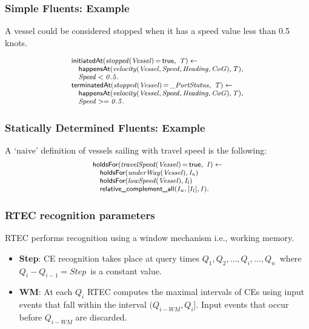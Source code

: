 \documentclass{beamer}
\newenvironment{mysplit}%
  {\arraycolsep 0pt \begin{array}{l}}%
  {\end{array}}
\def\happensAt{\textsf{\footnotesize happensAt}}
\def\holdsFor{\textsf{\footnotesize holdsFor}}
\def\initiatedAt{\textsf{\footnotesize initiatedAt}}
\def\terminatedAt{\textsf{\footnotesize terminatedAt}}
\def\complementall{\textsf{\footnotesize relative\_complement\_all}}
\def\true{\textsf{\footnotesize true}}
\DeclareMathOperator{\val}{=}  %
\begin{document}

\begin{frame}[fragile]
\frametitle{Simple Fluents: Example}
A vessel could be considered stopped when it has a speed value less than 0.5 knots.

\begin{align*} 
\footnotesize
        \begin{mysplit}
            \initiatedAt\mathit{(stopped(Vessel) \val \true,\ T) \leftarrow}\\
            \quad    \happensAt\mathit{(velocity(Vessel,Speed,Heading,CoG),T)},\\
            \quad    \mathit{Speed < 0.5}.\\
            \terminatedAt\mathit{(stopped(Vessel) \val \_PortStatus,\ T) \leftarrow}\\
            \quad    \happensAt\mathit{(velocity(Vessel,Speed,Heading,CoG),T)},\\
            \quad    \mathit{Speed >= 0.5}.\\
        \end{mysplit}
    \end{align*} 
\end{frame}


\begin{frame}[fragile]
\frametitle{Statically Determined Fluents: Example}
A `naive' definition of vessels sailing with travel speed is the following:
\begin{align*} 
\footnotesize
        \begin{mysplit}
            \holdsFor\mathit{(travelSpeed(Vessel) \val \true,\ I) \leftarrow}\\
            \quad    \holdsFor\mathit{(underWay(Vessel),I_u)}\\
            \quad    \holdsFor\mathit{(lowSpeed(Vessel),I_l)}\\            
            \quad    \complementall{(I_u,[I_l],I)}.\\
        \end{mysplit}
    \end{align*} 
\end{frame}


\begin{frame}[fragile]
\frametitle{RTEC recognition parameters}
RTEC performs recognition using a window mechanism i.e., working memory.
\begin{itemize}
\item \textbf{Step}: CE recognition takes place at query times $Q_1,Q_2,\ldots,Q_i,\ldots,Q_n$\ where $Q_i- Q_{i-1} = Step$\ is a constant value.
\item \textbf{WM}: At each $Q_i$ RTEC computes the maximal intervals of CEs using input events that fall within the interval $(Q_{i-WM},Q_{i}]$. Input events that occur before $Q_{i-WM}$ are discarded.
\end{itemize}
\end{frame}
\end{document}
